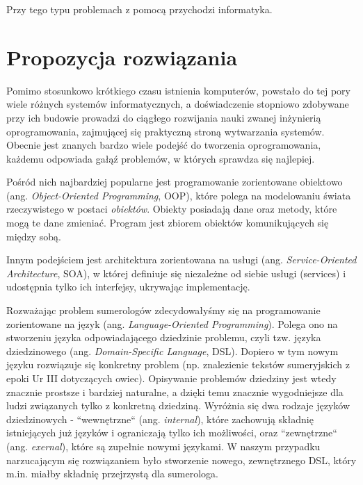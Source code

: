 Przy tego typu problemach z pomocą przychodzi informatyka. 

\section*{Propozycja rozwiązania}
Pomimo stosunkowo krótkiego czasu istnienia komputerów, powstało do tej pory wiele różnych systemów informatycznych, a doświadczenie stopniowo zdobywane przy ich budowie prowadzi do ciągłego rozwijania nauki zwanej inżynierią oprogramowania, zajmującej się praktyczną stroną wytwarzania systemów. Obecnie jest znanych bardzo wiele podejść do tworzenia oprogramowania, każdemu odpowiada gałąź problemów, w których sprawdza się najlepiej. 

Pośród nich najbardziej popularne jest programowanie zorientowane obiektowo (ang. \emph{Object-Oriented Programming}, OOP), które polega na modelowaniu świata rzeczywistego w postaci \textit{obiektów}. Obiekty posiadają dane oraz metody, które mogą te dane zmieniać. Program jest zbiorem obiektów komunikujących się między sobą. 

Innym podejściem jest architektura zorientowana na usługi (ang. \emph{Service-Oriented Architecture}, SOA), w której definiuje się niezależne od siebie usługi (services) i udostępnia tylko ich interfejsy, ukrywając implementację.

Rozważając problem sumerologów zdecydowałyśmy się na programowanie zorientowane na język (ang. \emph{Language-Oriented Programming}). Polega ono na stworzeniu języka odpowiadającego dziedzinie problemu, czyli tzw. języka dziedzinowego (ang. \emph{Domain-Specific Language}, DSL). Dopiero w tym nowym języku rozwiązuje się konkretny problem (np. znalezienie tekstów sumeryjskich z epoki Ur III dotyczących owiec). Opisywanie problemów dziedziny jest wtedy znacznie prostsze i bardziej naturalne, a dzięki temu znacznie wygodniejsze dla ludzi związanych tylko z konkretną dziedziną. 
Wyróżnia się dwa rodzaje języków dziedzinowych - ``wewnętrzne`` (ang. \emph{internal}), które zachowują składnię istniejących już języków i ograniczają tylko ich możliwości, oraz ``zewnętrzne`` (ang. \emph{exernal}), które są zupełnie nowymi językami. W naszym przypadku narzucającym się rozwiązaniem było stworzenie nowego, zewnętrznego DSL, który m.in. miałby składnię przejrzystą dla sumerologa. 

